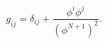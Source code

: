 \begin{equation}
g_{ij}=\delta_{ij}+\frac{\phi^i\phi^j}{(\phi^{N+1})^2}.
\label{metric2}
\end{equation}

